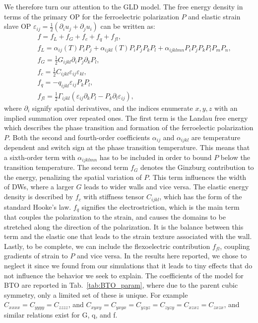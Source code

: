 We therefore turn our attention to the GLD model.
The free energy density in terms of the primary OP for the ferroelectric polarization $P$ and elastic strain slave OP $\varepsilon_{ij} = \frac{1}{2}(\partial_i u_j + \partial_j u_i)$ can be written as:
\begin{eqnarray}\label{eq:BTO_energy}
&&f = f_{L}+f_{G}+f_{c}+f_{q}+f_{fl},\\
&&f_{L} = \alpha_{ij}(T)P_iP_j + \alpha_{ijkl}(T)P_{i}P_{j}P_{k}P_{l} + \alpha_{ijklmn} P_i P_j P_k P_l P_m P_n,\\
&&f_{G} = \frac{1}{2}G_{ijkl}\partial_i P_j\partial_k P_l,\\
&&f_{c} = \frac{1}{2}C_{ijkl}\varepsilon_{ij}\varepsilon_{kl},\\
&&f_{q}= - q_{ijkl}\varepsilon_{ij}P_{k}P_{l},\\
&&f_{fl}=\frac{1}{2}\Gamma_{ijkl}(\varepsilon_{ij}\partial_k P_l - P_k\partial_l\varepsilon_{ij}),
\end{eqnarray}
where $\partial_i$ signify spatial derivatives, and the indices enumerate ${x,y,z}$ with an implied summation over repeated ones.
The first term is the Landau free energy which describes the phase transition and formation of the ferroelectic polarization $P$.
Both the second and fourth-order coefficients $\alpha_{ij}$ and $\alpha_{ijkl}$ are temperature dependent and switch sign at the phase transition temperature.
This means that a sixth-order term with $\alpha_{ijklmn}$ has to be included in order to bound $P$ below the transition temperature.
The second term $f_G$ denotes the Ginzburg contribution to the energy, penalizing the spatial variation of $P$.  
This term influences the width of DWs, where a larger $G$ leads to wider walls and vice versa.
The elastic energy density is described by $f_c$ with stiffness tensor $C_{ijkl}$, which has the form of the standard Hooke's law.
$f_q$ signifies the electrostriction, which is the main term that couples the polarization to the strain, and causes the domains to be stretched along the direction of the polarization.
It is the balance between this term and the elastic one that leads to the strain texture associated with the wall.
Lastly, to be complete, we can include the flexoelectric contribution $f_{fl}$, coupling gradients of strain to $P$ and vice versa.
In the results here reported, we chose to neglect it since we found from our simulations that it leads to tiny effects that do not influence the behavior we seek to explain.
The coefficients of the model for BTO are reported in Tab.~\ref{tab:BTO_param}, where due to the parent cubic symmetry, only a limited set of these is unique.
For example $C_{xxxx} = C_{yyyy} = C_{zzzz}$, and $C_{xyxy} = C_{yxyx} = C_{yzyz} = C_{zyzy} = C_{xzxz} = C_{zxzx}$, and similar relations exist for G, q, and f. 


